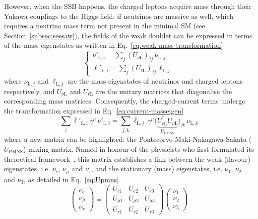 However, when the \ac{SSB} happens, the charged leptons acquire mass through their Yukawa couplings to the Higgs field; if neutrinos are massive as well, which requires a neutrino mass term not present in the minimal \ac{SM} (see Section~\ref{subsec:seesaw}), the fields of the weak doublet can be expressed in terms of the mass eigenstates as written in Eq.~\ref{eq:weak-mass-transformation}
\begin{equation}
    \label{eq:weak-mass-transformation}
    \begin{cases}
        \nu'_{\text{L}, i} = \sum_{j} \left(U_{\nu \text{L}}\right)_{ij}\, \nu_{\text{L}, j} \\[1ex]
        \ell'_{\text{L}, i} = \sum_{j} \left(U_{\ell \text{L}}\right)_{ij}\, \ell_{\text{L}, j}
    \end{cases}
\end{equation}
where $\nu_{\text{L}, j}$ and $\ell_{\text{L}, j}$ are the mass eigenstates of neutrinos and charged leptons respectively, and $U_{\nu\text{L}}$ and $U_{\ell\text{L}}$ are the unitary matrices that diagonalise the corresponding mass matrices. Consequently, the charged-current terms undergo the transformation expressed in Eq.~\ref{eq:current-masseigen}
\begin{equation}
    \label{eq:current-masseigen}
    \sum_i \bar{\ell}'_{\text{L}, i}\, \gamma^{\mu}\, \nu'_{\text{L}, i}
    = \sum_{j,k} \bar{\ell}_{\text{L}, j}\, \gamma^{\mu}
      \big(\underbrace{U_{\ell \text{L}}^\dagger U_{\nu \text{L}}}_{U_{\text{PMNS}}}\big)_{jk}\,
      \nu_{\text{L}, k}
\end{equation}
where a new matrix can be highlighted: the Pontecorvo-Maki-Nakagawa-Sakata ($U_\text{PMNS}$) mixing matrix. 
Named in honour of the physicists who first formulated its theoretical framework~\cite{Pontecorvo1957, Pontecorvo1967, Maki1962}, 
this matrix establishes a link between the weak (flavour) eigenstates, i.e. $\nu_e$, $\nu_\mu$ and $\nu_\tau$, 
and the stationary (mass) eigenstates, i.e. $\nu_1$, $\nu_2$ and $\nu_3$,
as detailed in Eq.~\ref{eq:Upmns}. 
\begin{equation}
    \label{eq:Upmns}
    \begin{pmatrix}
    \nu_e \\
    \nu_\mu \\
    \nu_\tau
    \end{pmatrix}
    =
    \begin{pmatrix}
    U_{e1} & U_{e2} & U_{e3} \\
    U_{\mu1} & U_{\mu2} & U_{\mu3} \\
    U_{\tau1} & U_{\tau2} & U_{\tau3}
    \end{pmatrix}
    \begin{pmatrix}
    \nu_1 \\
    \nu_2 \\
    \nu_3
\end{pmatrix}
\end{equation}

